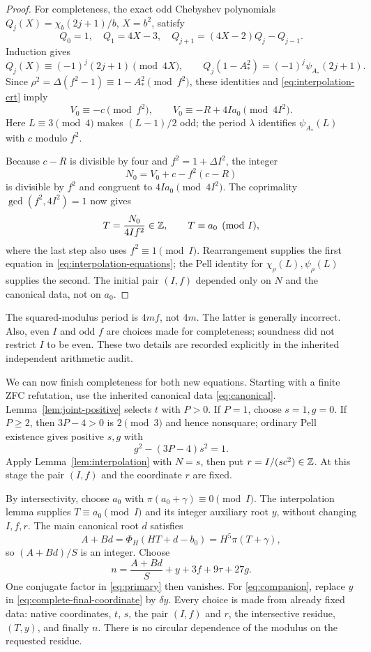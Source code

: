 \begin{proof}
For completeness, the exact odd Chebyshev polynomials
$Q_j(X)=\chi_b(2j+1)/b$, $X=b^2$, satisfy
\[
 Q_0=1,\quad Q_1=4X-3,\quad
 Q_{j+1}=(4X-2)Q_j-Q_{j-1}.
\]
Induction gives
\[
 Q_j(X)\equiv(-1)^j(2j+1)\pmod{4X},\qquad
 Q_j(1-A_*^2)=(-1)^j\psi_{A_*}(2j+1).
\]
Since $\rho^2=\Delta(f^2-1)\equiv1-A_*^2\pmod{f^2}$,
these identities and \eqref{eq:interpolation-crt} imply
\begin{equation}\label{eq:two-aux-residues}
 V_0\equiv-c\pmod{f^2},\qquad
 V_0\equiv-R+4Ia_0\pmod{4I^2}.
\end{equation}
Here $L\equiv3\pmod4$ makes $(L-1)/2$ odd; the period $\lambda$
identifies $\psi_{A_*}(L)$ with $c$ modulo $f^2$.

Because $c-R$ is divisible by four and $f^2=1+\Delta I^2$,
the integer
\[
 N_0=V_0+c-f^2(c-R)
\]
is divisible by $f^2$ and congruent to $4Ia_0\pmod{4I^2}$.
The coprimality $\gcd(f^2,4I^2)=1$ now gives
\[
 T=\frac{N_0}{4If^2}\in\mathbb Z,\qquad T\equiv a_0\pmod I,
\]
where the last step also uses $f^2\equiv1\pmod I$.
Rearrangement supplies the first equation in
\eqref{eq:interpolation-equations}; the Pell identity for
$\chi_\rho(L),\psi_\rho(L)$ supplies the second. The initial pair
$(I,f)$ depended only on $N$ and the canonical data, not on $a_0$.
\end{proof}

\begin{remark}
The squared-modulus period is $4mf$, not $4m$. The latter is generally
incorrect. Also, even $I$ and odd $f$ are choices made for completeness;
soundness did not restrict $I$ to be even. These two details are recorded
explicitly in the inherited independent arithmetic audit.
\end{remark}

We can now finish completeness for both new equations. Starting with a
finite ZFC refutation, use the inherited canonical data
\eqref{eq:canonical}. Lemma~\ref{lem:joint-positive} selects $t$
with $P>0$. If $P=1$, choose $s=1,g=0$. If $P\ge2$, then
$3P-4>0$ is $2\pmod3$ and hence nonsquare; ordinary Pell existence
gives positive $s,g$ with
\[
 g^2-(3P-4)s^2=1.
\]
Apply Lemma~\ref{lem:interpolation} with $N=s$, then put
$r=I/(sc^2)\in\mathbb Z$. At this stage the pair $(I,f)$ and the coordinate
$r$ are fixed.

By intersectivity, choose $a_0$ with
$\pi(a_0+\gamma)\equiv0\pmod I$. The interpolation lemma supplies
$T\equiv a_0\pmod I$ and its integer auxiliary root $y$, without
changing $I,f,r$. The main canonical root $d$ satisfies
\[
 A+Bd=\Phi_H(HT+d-b_0)=H^5\pi(T+\gamma),
\]
so $(A+Bd)/S$ is an integer. Choose
\begin{equation}\label{eq:complete-final-coordinate}
 n=\frac{A+Bd}{S}+y+3f+9\tau+27g.
\end{equation}
One conjugate factor in \eqref{eq:primary} then vanishes. For
\eqref{eq:companion}, replace $y$ in
\eqref{eq:complete-final-coordinate} by $\delta y$. Every choice is
made from already fixed data: native coordinates, $t$, $s$, the pair
$(I,f)$ and $r$, the intersective residue, $(T,y)$, and finally $n$.
There is no circular dependence of the modulus on the requested residue.

